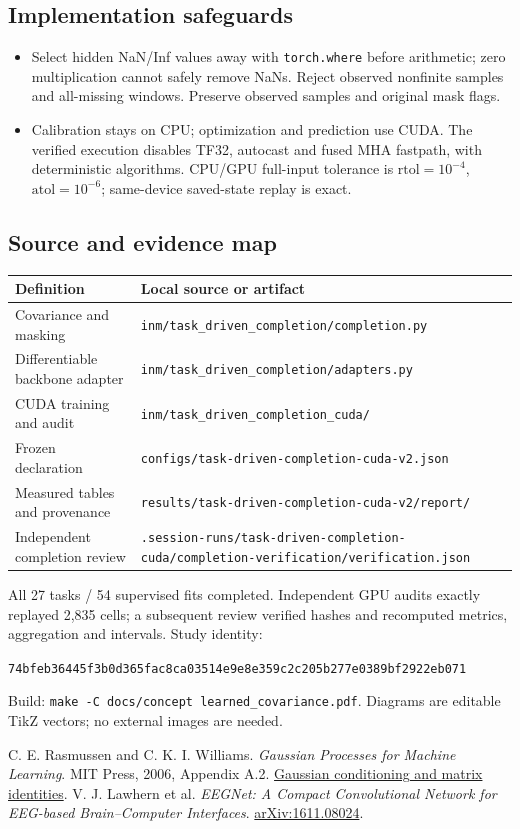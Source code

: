 \documentclass[11pt,a4paper]{article}
\newcommand{\code}[1]{{\small\nolinkurl{#1}}}
\begin{document}
\subsection{Implementation safeguards}
\begin{itemize}
\item Select hidden NaN/Inf values away with \code{torch.where} before arithmetic;
zero multiplication cannot safely remove NaNs. Reject observed nonfinite samples
and all-missing windows. Preserve observed samples and original mask flags.
\item Calibration stays on CPU; optimization and prediction use CUDA. The
verified execution disables TF32, autocast and fused MHA fastpath, with
deterministic algorithms. CPU/GPU full-input tolerance is
$\mathrm{rtol}=10^{-4}$, $\mathrm{atol}=10^{-6}$; same-device saved-state replay is exact.
\end{itemize}

\subsection{Source and evidence map}
\begin{tabularx}{\linewidth}{@{}lY@{}}\toprule
Definition & Local source or artifact \\ \midrule
Covariance and masking & \code{inm/task_driven_completion/completion.py} \\
Differentiable backbone adapter & \code{inm/task_driven_completion/adapters.py} \\
CUDA training and audit & \code{inm/task_driven_completion_cuda/} \\
Frozen declaration & \code{configs/task-driven-completion-cuda-v2.json} \\
Measured tables and provenance & \code{results/task-driven-completion-cuda-v2/report/} \\
Independent completion review & \code{.session-runs/task-driven-completion-cuda/completion-verification/verification.json} \\ \bottomrule
\end{tabularx}
All 27 tasks / 54 supervised fits completed. Independent GPU audits exactly
replayed 2,835 cells; a subsequent review verified hashes and recomputed metrics,
aggregation and intervals. Study identity:\par
{\footnotesize\nolinkurl{74bfeb36445f3b0d365fac8ca03514e9e8e359c2c205b277e0389bf2922eb071}}

Build: {\small\verb|make -C docs/concept learned_covariance.pdf|}.
Diagrams are editable TikZ vectors; no external images are needed.

\begin{thebibliography}{2}\small
{} C. E. Rasmussen and C. K. I. Williams.
\emph{Gaussian Processes for Machine Learning}. MIT Press, 2006, Appendix A.2.
\href{https://gaussianprocess.org/gpml/chapters/RWA.pdf}{Gaussian conditioning and matrix identities}.
 V. J. Lawhern et al.
\emph{EEGNet: A Compact Convolutional Network for EEG-based Brain--Computer Interfaces}.
\href{https://arxiv.org/abs/1611.08024}{arXiv:1611.08024}.
\end{thebibliography}
\end{document}
